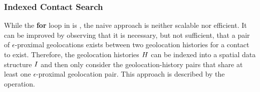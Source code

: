 
\subsubsection{Indexed Contact Search}
While the \textbf{for} loop in  is  \cite[p. 14]{Herlihy2012}, the naive approach is neither scalable nor efficient. It can be improved by observing that it is necessary, but not sufficient, that a pair of $\epsilon$-proximal geolocations exists between two geolocation histories for a contact to exist. Therefore, the geolocation histories $H$ can be indexed into a spatial data structure $I$ \citep{Mokbel2003, Dinh2010, Mahmood2019} and then only consider the geolocation-history pairs that share at least one $\epsilon$-proximal geolocation pair. This approach is described by the  operation.

